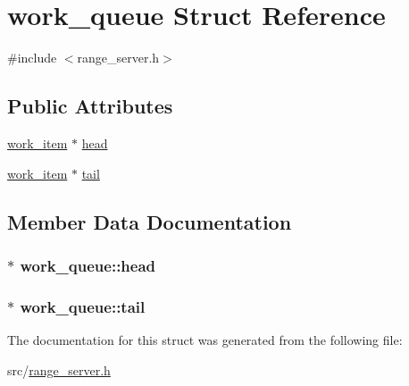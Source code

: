 \hypertarget{structwork__queue}{\section{work\-\_\-queue Struct Reference}
\label{structwork__queue}
}


{\ttfamily \#include $<$range\-\_\-server.\-h$>$}

\subsection*{Public Attributes}
\begin{DoxyCompactItemize}
\item 
\hyperlink{structwork__item}{work\-\_\-item} $\ast$ \hyperlink{structwork__queue_ae23ecfba9f307e8b4f4b120766067f19}{head}
\item 
\hyperlink{structwork__item}{work\-\_\-item} $\ast$ \hyperlink{structwork__queue_a0978e900d44a1f2213c9b42e51dbef7a}{tail}
\end{DoxyCompactItemize}


\subsection{Member Data Documentation}
\hypertarget{structwork__queue_ae23ecfba9f307e8b4f4b120766067f19}{
\subsubsection[{head}]{$\ast$ work\-\_\-queue\-::head}}\label{structwork__queue_ae23ecfba9f307e8b4f4b120766067f19}
\hypertarget{structwork__queue_a0978e900d44a1f2213c9b42e51dbef7a}{
\subsubsection[{tail}]{$\ast$ work\-\_\-queue\-::tail}}\label{structwork__queue_a0978e900d44a1f2213c9b42e51dbef7a}


The documentation for this struct was generated from the following file\-:\begin{DoxyCompactItemize}
\item 
src/\hyperlink{range__server_8h}{range\-\_\-server.\-h}\end{DoxyCompactItemize}
